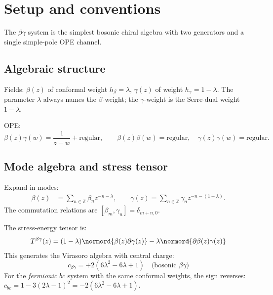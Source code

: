 \section{Setup and conventions}

The $\beta\gamma$ system is the simplest bosonic chiral algebra
with two generators and a single simple-pole OPE channel.

\subsection{Algebraic structure}

Fields: $\beta(z)$ of conformal weight $h_\beta = \lambda$,
$\gamma(z)$ of weight $h_\gamma = 1 - \lambda$. The parameter
$\lambda$ always names the $\beta$-weight; the $\gamma$-weight is the
Serre-dual weight $1-\lambda$.

OPE:
\[
\beta(z)\gamma(w) = \frac{1}{z-w} + \text{regular},
\qquad
\beta(z)\beta(w) = \text{regular}, \quad \gamma(z)\gamma(w) = \text{regular}.
\]

\subsection{Mode algebra and stress tensor}

\begin{proposition}
\label{prop:beta-gamma-modes}
Expand in modes:
\begin{align}
\beta(z) &= \sum_{n \in \mathbb{Z}} \beta_n z^{-n-\lambda},\qquad
\gamma(z) = \sum_{n \in \mathbb{Z}} \gamma_n z^{-n-(1-\lambda)}.
\end{align}
The commutation relations are $[\beta_m, \gamma_n] = \delta_{m+n,0}$.
\end{proposition}

\begin{theorem}
\label{thm:beta-gamma-stress}
The stress-energy tensor is:
\[
T^{\beta\gamma}(z) = (1-\lambda) \normord{\beta(z)\partial\gamma(z)} - \lambda \normord{\partial\beta(z)\gamma(z)}
\]
This generates the Virasoro algebra with central charge:
\[
c_{\beta\gamma} = +2(6\lambda^2 - 6\lambda + 1) \quad \text{(bosonic $\beta\gamma$)}
\]
For the \emph{fermionic} $bc$ system with the same conformal weights, the sign reverses:
$c_{bc} = 1 - 3(2\lambda - 1)^2 = -2(6\lambda^2 - 6\lambda + 1)$.
\end{theorem}

